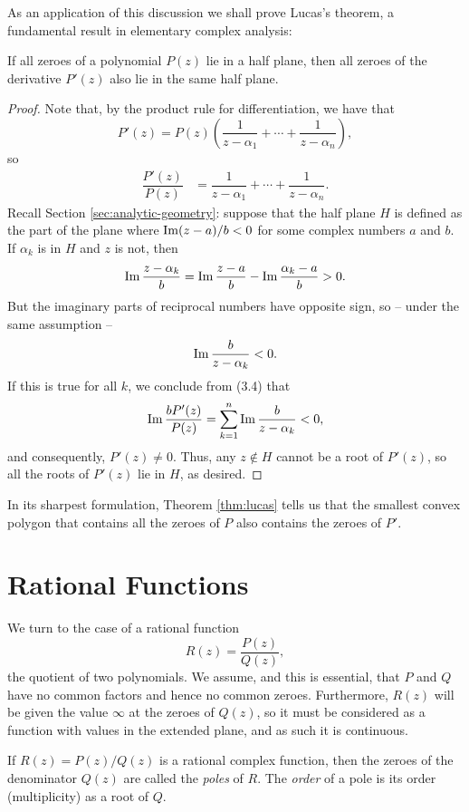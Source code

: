 As an application of this discussion we shall prove Lucas's theorem, a fundamental result in elementary complex analysis:
\begin{theorem}[Lucas]
	\label{thm:lucas}
	If all zeroes of a polynomial $P(z)$ lie in a half plane, then all zeroes of the derivative $P'(z)$ also lie in the same half plane.
\end{theorem}
\begin{proof}
	Note that, by the product rule for differentiation, we have that $$P'(z)=P(z)\left(\dfrac{1}{z-\alpha_1}+\cdots+\dfrac{1}{z-\alpha_n}\right),$$ so 
	\begin{align}
	\dfrac{P'(z)}{P(z)} &=\dfrac{1}{z-\alpha_1}+\cdots+\dfrac{1}{z-\alpha_n}.
	\end{align}
	Recall Section \ref{sec:analytic-geometry}: suppose that the half plane $H$ is defined as the part of the plane where $\operatorname{Im} (z-a)/b<0$ for some complex numbers $a$ and $b$. If $\alpha_k$ is in $H$ and $z$ is not, then $$\operatorname{Im} \dfrac{z-\alpha_k}{b}=\operatorname{Im} \dfrac{z-a}{b}-\operatorname{Im} \dfrac{\alpha_k-a}{b}>0.$$ But the imaginary parts of reciprocal numbers have opposite sign, so -- under the same assumption -- $$\operatorname{Im} \dfrac{b}{z-\alpha_k}<0.$$ If this is true for all $k$, we conclude from (3.4) that $$\operatorname{Im} \dfrac{bP'(z)}{P(z)}=\sum_{k=1}^{n} \operatorname{Im} \dfrac{b}{z-\alpha_k}<0,$$ and consequently, $P'(z) \neq 0$. Thus, any $z \notin H$ cannot be a root of $P'(z)$, so all the roots of $P'(z)$ lie in $H$, as desired.
\end{proof}

In its sharpest formulation, Theorem \ref{thm:lucas} tells us that the smallest convex polygon that contains all the zeroes of $P$ also contains the zeroes of $P'$.

\section{Rational Functions}
We turn to the case of a rational function $$R(z)=\dfrac{P(z)}{Q(z)},$$ the quotient of two polynomials. We assume, and this is essential, that $P$ and $Q$ have no common factors and hence no common zeroes. Furthermore, $R(z)$ will be given the value $\infty$ at the zeroes of $Q(z)$, so it must be considered as a function with values in the extended plane, and as such it is continuous.

\begin{definition}
	If $R(z)=P(z)/Q(z)$ is a rational complex function, then the zeroes of the denominator $Q(z)$ are called the \emph{poles} of $R$. The \emph{order} of a pole is its order (multiplicity) as a root of $Q$.
\end{definition}

